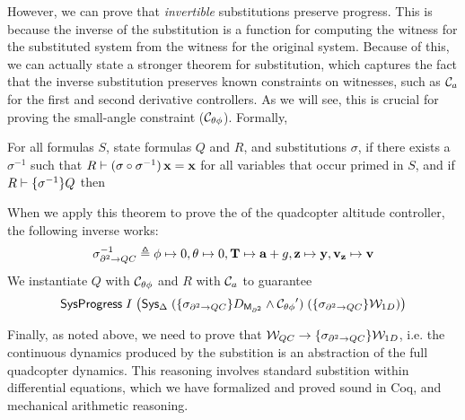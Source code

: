 However, we can prove that \emph{invertible} substitutions preserve
progress.  This is because the inverse of the substitution is a function
for computing the \Enabledness witness for the substituted system from
the \Enabledness witness for the original system.  Because of this, we can
actually state a stronger \progress{} theorem for substitution, which
captures the fact that the inverse substitution preserves known constraints
on \Enabledness witnesses, such as $\Ca$ for the first and second
derivative controllers.  As we will see, this is crucial for proving the
small-angle constraint ($\smallangle$).  Formally,
\begin{theorem}{}
For all formulas $S$, state formulas $Q$ and $R$, and substitutions
$\sigma$, if there exists a $\sigma^{-1}$ such that
$R\entails(\sigma \circ \sigma^{-1})\, \tlavar{x} = \tlavar{x}$ for all
variables  that occur primed in $S$, and if
$R \entails \Rename{\sigma^{-1}}{Q}$ then
\begin{prooftree}
\end{prooftree}
\end{theorem}

When we apply this theorem to prove the \progress{} of the quadcopter
altitude controller, the following inverse works:
\[
\sigma_{\partial^2\rightarrow{}QC}^{-1} \triangleq \tlavar{\roll} \mapsto 0, \tlavar{\pitch} \mapsto 0, \tlavar{T} \mapsto \tlavar{a} + g, \tlavar{z} \mapsto \tlavar{y}, \tlavar{v_z} \mapsto \tlavar{v}
\]
We instantiate $Q$ with $\smallangle$ and $R$ with $\Ca$ to guarantee
\[
\SysNeverStuckP{I}{\big(\Sys{(\Rename{\sigma_{\partial^2\rightarrow{}QC}}{D_{\derivShimx}}\wedge \Next{\smallangle})}{(\Rename{\sigma_{\partial^2\rightarrow{}QC}}{\W_{1D}})}{\Delta}\big)}
\]

Finally, as noted above, we need to prove that
$\W_{QC} \rightarrow \Rename{\sigma_{\partial^2\rightarrow{}QC}}{\W_{1D}}$,
i.e. the continuous dynamics produced by the substition is an abstraction
of the full quadcopter dynamics.  This reasoning involves standard
substition within differential equations, which we have formalized and
proved sound in Coq, and mechanical arithmetic reasoning.

